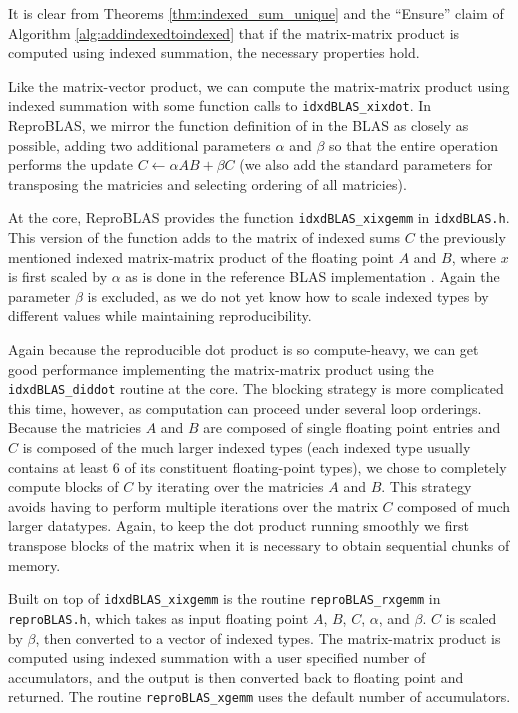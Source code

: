   It is clear from Theorems \ref{thm:indexed_sum_unique} and the ``Ensure'' claim of Algorithm \ref{alg:addindexedtoindexed} that if the matrix-matrix product is computed using indexed summation, the necessary properties hold.

  Like the matrix-vector product, we can compute the matrix-matrix product using indexed summation with some function calls to \texttt{idxdBLAS\_xixdot}. In ReproBLAS, we mirror the function definition of  in the BLAS as closely as possible, adding two additional parameters $\alpha$ and $\beta$ so that the entire operation performs the update $C \gets \alpha AB + \beta C$ (we also add the standard parameters for transposing the matricies and selecting ordering of all matricies).

  At the core, ReproBLAS provides the function \texttt{idxdBLAS\_xixgemm} in \texttt{idxdBLAS.h}. This version of the function adds to the matrix of indexed sums $C$ the previously mentioned indexed matrix-matrix product of the floating point $A$ and $B$, where $x$ is first scaled by $\alpha$ as is done in the reference BLAS implementation \cite{netlib}. Again the parameter $\beta$ is excluded, as we do not yet know how to scale indexed types by different values while maintaining reproducibility.

  Again because the reproducible dot product is so compute-heavy, we can get good performance implementing the matrix-matrix product using the \texttt{idxdBLAS\_diddot} routine at the core. The blocking strategy is more complicated this time, however, as computation can proceed under several loop orderings. Because the matricies $A$ and $B$ are composed of single floating point entries and $C$ is composed of the much larger indexed types (each indexed type usually contains at least 6 of its constituent floating-point types), we chose to completely compute blocks of $C$ by iterating over the matricies $A$ and $B$. This strategy avoids having to perform multiple iterations over the matrix $C$ composed of much larger datatypes. Again, to keep the dot product running smoothly we first transpose blocks of the matrix when it is necessary to obtain sequential chunks of memory.

  Built on top of \texttt{idxdBLAS\_xixgemm} is the routine \texttt{reproBLAS\_rxgemm} in \texttt{reproBLAS.h}, which takes as input floating point $A$, $B$, $C$, $\alpha$, and $\beta$. $C$ is scaled by $\beta$, then converted to a vector of indexed types. The matrix-matrix product is computed using indexed summation with a user specified number of accumulators, and the output is then converted back to floating point and returned. The routine \texttt{reproBLAS\_xgemm} uses the default number of accumulators.

